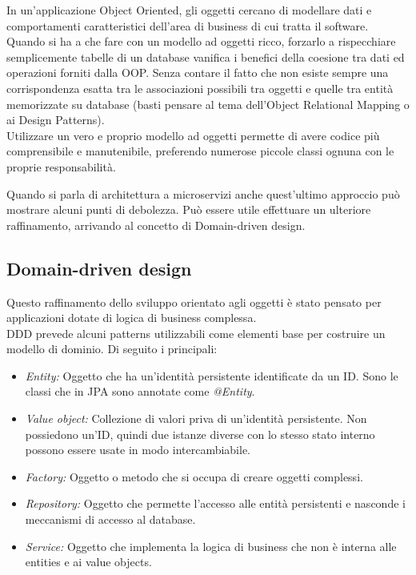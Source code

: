 In un'applicazione Object Oriented, gli oggetti cercano di modellare dati e comportamenti caratteristici dell'area di business di cui tratta il software.
Quando si ha a che fare con un modello ad oggetti ricco, forzarlo a rispecchiare semplicemente tabelle di un database vanifica i benefici della coesione tra dati ed operazioni forniti dalla OOP.
Senza contare il fatto che non esiste sempre una corrispondenza esatta tra le associazioni possibili tra oggetti e quelle tra entità memorizzate su database (basti pensare al tema dell'Object Relational Mapping o ai Design Patterns\cite{design_patterns}).\\
Utilizzare un vero e proprio modello ad oggetti permette di avere codice più comprensibile e manutenibile, preferendo numerose piccole classi ognuna con le proprie responsabilità.

Quando si parla di architettura a microservizi anche quest'ultimo approccio può mostrare alcuni punti di debolezza.
Può essere utile effettuare un ulteriore raffinamento, arrivando al concetto di Domain-driven design.

\subsection{Domain-driven design}
Questo raffinamento dello sviluppo orientato agli oggetti\cite{ddd}\cite{microservices} è stato pensato per applicazioni dotate di logica di business complessa.\\

DDD prevede alcuni patterns utilizzabili come elementi base per costruire un modello di dominio.
Di seguito i principali:
\begin{itemize}
	\item \textit{Entity:} Oggetto che ha un'identità persistente identificate da un ID. Sono le classi che in JPA sono annotate come \textit{@Entity}.
	\item \textit{Value object:} Collezione di valori priva di un'identità persistente. Non possiedono un'ID, quindi due istanze diverse con lo stesso stato interno possono essere usate in modo intercambiabile.
	\item \textit{Factory:} Oggetto o metodo che si occupa di creare oggetti complessi.
	\item \textit{Repository:} Oggetto che permette l'accesso alle entità persistenti e nasconde i meccanismi di accesso al database.
	\item \textit{Service:} Oggetto che implementa la logica di business che non è interna alle entities e ai value objects.
\end{itemize}


